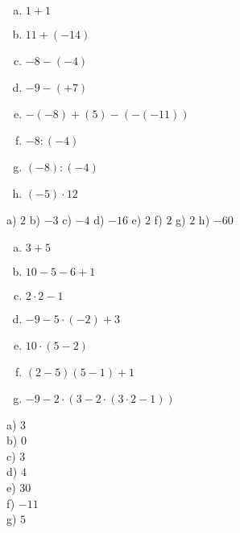     
    \begin{multicols}{2}
        \begin{tehtava}
            \begin{enumerate}[(a)]
                \item $1+1$
                \item $11+(-14)$
                \item $-8-(-4)$
                \item $-9-(+7)$
                \item $-(-8)+(5)-(-(-11))$
                \item $-8:(-4)$
                \item $(-8):(-4)$
                \item $(-5)\cdot 12$
            \end{enumerate}
            
            \begin{vastaus}
                a) $2$
                b) $-3$
                c) $-4$
                d) $-16$
                e) $2$
                f) $2$
                g) $2$
                h) $-60$
            \end{vastaus}
        \end{tehtava}
        
        \begin{tehtava}
            \begin{enumerate}[(a)]
                \item $3+5$
                \item $10-5-6+1$
                \item $2 \cdot 2 - 1$
                \item $-9 - 5 \cdot (-2) + 3$ 
                \item $10 \cdot (5 - 2)$
                \item $(2-5)(5 - 1) + 1$
                \item $-9 - 2 \cdot ( 3 - 2 \cdot (3\cdot2 - 1))$
            \end{enumerate}
            
            \begin{vastaus} 
                a) $3$ \\
                b) $0$ \\
                c) $3$ \\
                d) $4$ \\
                e) $30$ \\
                f) $-11$ \\
                g) $5$ \\
            \end{vastaus}
        \end{tehtava}
    \end{multicols}